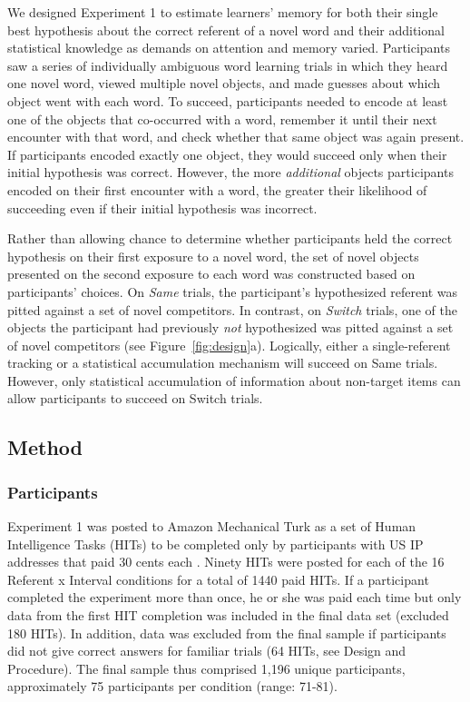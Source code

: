 \documentclass[man,floatsintext]{apa6}
\begin{document}
We designed Experiment 1 to estimate learners' memory for both their single best hypothesis about the correct referent of a novel word and their additional statistical knowledge as demands on attention and memory varied. Participants saw a series of individually ambiguous word learning trials in which they heard one novel word, viewed multiple novel objects, and made guesses about which object went with each word. To succeed, participants needed to encode at least one of the objects that co-occurred with a word, remember it until their next encounter with that word, and check whether that same object was again present. If participants encoded exactly one object, they would succeed only when their initial hypothesis was correct. However, the more \emph{additional} objects participants encoded on their first encounter with a word, the greater their likelihood of succeeding even if their initial hypothesis was incorrect. 

Rather than allowing chance to determine whether participants held the correct hypothesis on their first exposure to a novel word, the set of novel objects presented on the second exposure to each word was constructed based on participants' choices. On \emph{Same} trials, the participant's hypothesized referent was pitted against a set of novel competitors. In contrast, on \emph{Switch} trials, one of the objects the participant had previously \emph{not} hypothesized was pitted against a set of novel competitors (see Figure~\ref{fig:design}a). Logically, either a single-referent tracking or a statistical accumulation mechanism will succeed on Same trials. However, only statistical accumulation of information about non-target items can allow participants to succeed on Switch trials.

\subsection{Method}

\subsubsection{Participants}

Experiment 1 was posted to Amazon Mechanical Turk as a set of Human Intelligence Tasks (HITs) to be completed only by participants with US IP addresses that paid 30 cents each \cite<for a detailed comparison of laboratory and Mechanical Turk studies see>{Crump2013}. Ninety HITs were posted for each of the 16 Referent x Interval conditions for a total of 1440 paid HITs. If a participant completed the experiment more than once, he or she was paid each time but only data from the first HIT completion was included in the final data set (excluded 180 HITs). In addition, data was excluded from the final sample if participants did not give correct answers for familiar trials (64 HITs, see Design and Procedure). The final sample thus comprised 1,196 unique participants, approximately 75 participants per condition (range: 71-81).
\end{document}
